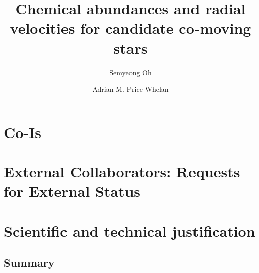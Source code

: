 \documentclass[11pt]{article}
\title{Chemical abundances and radial velocities for candidate co-moving stars}
\author[1]{Semyeong Oh}
\author[1]{Adrian M. Price-Whelan}
\affil[1]{Princeton University, USA}
\date{}
\begin{document}
\maketitle

\section*{Co-Is}

\section*{External Collaborators: Requests for External Status}

\section{Scientific and technical justification}

\subsection{Summary}
\end{document}

